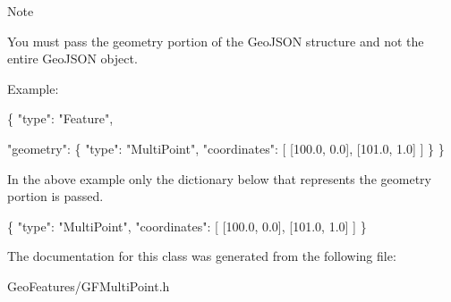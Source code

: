 \begin{DoxyNote}{Note}


You must pass the geometry portion of the Geo\+J\+S\+O\+N structure and not the entire Geo\+J\+S\+O\+N object.

Example\+:


\begin{DoxyCode}
\{
      \textcolor{stringliteral}{"type"}: \textcolor{stringliteral}{"Feature"},

      \textcolor{stringliteral}{"geometry"}: \{ \textcolor{stringliteral}{"type"}: \textcolor{stringliteral}{"MultiPoint"},
                    \textcolor{stringliteral}{"coordinates"}: [ [100.0, 0.0], [101.0, 1.0] ]
                  \}
 \}
\end{DoxyCode}


In the above example only the dictionary below that represents the geometry portion is passed.


\begin{DoxyCode}
\{
    \textcolor{stringliteral}{"type"}: \textcolor{stringliteral}{"MultiPoint"},
    \textcolor{stringliteral}{"coordinates"}: [ [100.0, 0.0], [101.0, 1.0] ]
\}
\end{DoxyCode}
 
\end{DoxyNote}


The documentation for this class was generated from the following file\+:\begin{DoxyCompactItemize}
\item 
Geo\+Features/G\+F\+Multi\+Point.\+h\end{DoxyCompactItemize}
